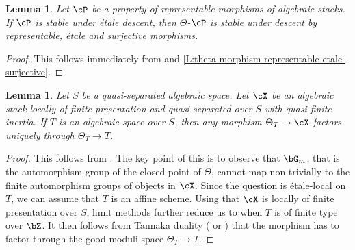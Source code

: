 \documentclass[a4paper]{amsart}
\numberwithin{equation}{section}
\theoremstyle{plain}
\newtheorem{lem}[thm]{Lemma}
\theoremstyle{definition}
\newcommand{\jochennew}[1]{{\color{red}{#1}}}
\begin{document}
\begin{lem} \label{L:descent}
Let $\cP$ be a property of representable morphisms of algebraic stacks.  
If $\cP$ is stable under \'etale descent, then $\Theta$-$\cP$ is stable under descent by representable, \'etale and surjective morphisms. 
\end{lem}

\begin{proof} This follows immediately from  and \ref{L:theta-morphism-representable-etale-surjective}.
\end{proof}


\begin{lem} \label{L:quasi-finite-factoring-theta-reductive}
{Let $S$ be a quasi-separated algebraic space. Let $\cX$ be an algebraic stack locally of finite presentation and quasi-separated over $S$} with quasi-finite inertia.
If $T$ is an algebraic space {over $S$}, then any morphism $\Theta_T \to \cX$ factors uniquely through $\Theta_T \to T$.
\end{lem}


\begin{proof} This follows from \cite[Lem.~1.3.13]{hlinstability}. The key point of this is to observe that $\bG_m$, that is the automorphism group of the closed point of $\Theta$, cannot map non-trivially to the finite automorphism groups of objects in $\cX$. 
	{Since the question is \'etale-local on $T$, we can assume that $T$ is an affine scheme.  Using that $\cX$ is locally of finite presentation over $S$, limit methods further reduce us to when $T$ is of finite type over $\bZ$. }
	It then follows from Tannaka duality (\cite[Theorem 1.1]{hallj_dary_coherent_tannakian_duality} or \cite{BhattHL}) that the morphism has to factor through the good moduli space $\Theta_T\to T$.
\end{proof}
\end{document}
